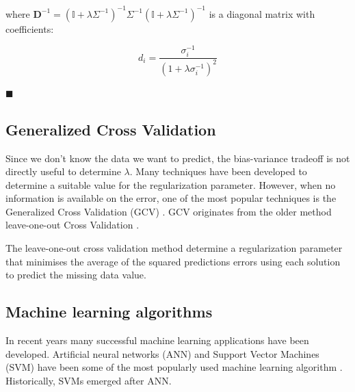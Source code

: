 \noindent where $\mathbf{D}^{-1}  = (\mathbb{I} + \lambda \Sigma^{-1})^{-1} \Sigma^{-1} (\mathbb{I} + \lambda \Sigma^{-1})^{-1}$ is a diagonal matrix with coefficients:

\begin{equation*}
d_i = \frac{\sigma_i^{-1}}{(1+\lambda\sigma_i^{-1})^2}
\end{equation*}

$\blacksquare$

\subsection{Generalized Cross Validation}
Since we don't know the data we want to predict, the bias-variance tradeoff is not directly useful to determine $\lambda$. Many techniques have been developed to determine a suitable value for the regularization parameter. However, when no information is available on the error, one of the most popular techniques is the Generalized Cross Validation (GCV) \cite{bauer2011}. 
GCV originates from the older method leave-one-out Cross Validation \cite{stone1974}.

The leave-one-out cross validation method determine a regularization parameter that minimises the average of the squared predictions errors using each solution to predict the missing data value.






\subsection{Machine learning algorithms}
In recent years many successful machine learning applications have been developed. Artificial neural networks (ANN) and Support Vector Machines (SVM) have been some of the most popularly used machine learning algorithm \cite{haykin1998}. Historically, SVMs emerged after ANN.

